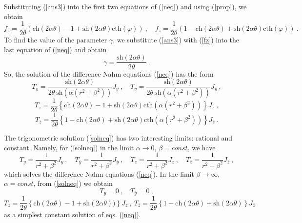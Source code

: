 \documentclass[a4paper,11pt]{article}
\numberwithin{equation}{section}
\def\th{\theta}
\def\a{\alpha}
\def\b{\beta}
\def\g{\gamma}
\def\vp{\varphi}
\newcommand{\sh}{\mathrm{sh}}
\newcommand{\ch}{\mathrm{ch}}
\newcommand{\cth}{\mathrm{cth}}
\begin{document}
Substituting (\ref{ans3}) into the first two equations of (\ref{neq}) and using 
(\ref{prop}), we obtain
\begin{equation}
f_z=\frac{1}{2\th }(\ch (2\a\th) -1 + \sh(2\a\th ) \cth(\vp ))\ , 
\quad
f_{\bar z}=\frac{1}{2\th }(1 - \ch(2\a\th ) + \sh(2\a\th )\cth(\vp ) )
\ .
\label{fz}
\end{equation}
To find the value of the parameter $\g$, we substitute (\ref{ans3}) with (\ref{fz}) 
into the last equation of (\ref{neq}) and obtain
$$
\g =\frac{\sh(2\a\th )}{2\th}\ .
$$
So, the solution of the difference Nahm equations (\ref{neq})
has the form
$$
T_y= \frac{\sh(2\a\th )}{2\th\ \sh(\a (r^2 + \b^2) )}J_y\ , \quad
T_{\bar y}=\frac{\sh(2\a\th )}{2\th\ \sh(\a (r^2 +\b^2 ))} J_{\bar y} \ ,
$$
$$
T_z=\frac{1}{2\th }\left\{\ch (2\a\th)-1 +  \sh(2\a\th )
\cth(\a (r^2 +\b^2 ))\right \}J_z\ ,
$$
\begin{equation}
T_{\bar z}=\frac{1}{2\th }\left\{1 - \ch(2\a\th ) + \sh(2\a\th )
\cth(\a (r^2 +\b^2 ))\right \}J_{\bar z}\ .
\label{solneq}
\end{equation}

The trigonometric solution (\ref{solneq}) has two interesting limits:
rational and constant. Namely, for (\ref{solneq}) in the limit $\a\to 0$, $\b =const$,
we have
\begin{equation}
T_y= \frac{1}{r^2 + \b^2}J_y\ , \quad
T_{\bar y}=\frac{1}{r^2 +\b^2} J_{\bar y} \ ,\quad
T_z=\frac{1}{r^2 +\b^2}J_z \ ,\quad
T_{\bar z}=\frac{1}{r^2 +\b^2 }J_{\bar z}\ ,
\label{solne}
\end{equation}
which solves  the difference Nahm equations (\ref{neq}).
In the limit $\b\to\infty$, $\a = const$, from (\ref{solneq}) we obtain
$$
T_y= 0\ ,\quad 
T_{\bar y}=0\ ,
$$
\begin{equation}
T_z=\frac{1}{2\th }\left\{\ch (2\a\th)-1 +  \sh(2\a\th ))\right \}J_z\ ,\
T_{\bar z}=\frac{1}{2\th }\left\{1 - \ch(2\a\th ) + \sh(2\a\th )
\right \}J_{\bar z}
\label{soln}
\end{equation}
as a simplest constant solution of eqs. (\ref{neq}).
\end{document}
